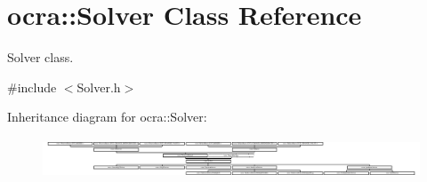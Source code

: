 \hypertarget{classocra_1_1Solver}{}\section{ocra\+:\+:Solver Class Reference}
\label{classocra_1_1Solver}


Solver class.  




{\ttfamily \#include $<$Solver.\+h$>$}

Inheritance diagram for ocra\+:\+:Solver\+:\begin{figure}[H]
\begin{center}
\leavevmode
\includegraphics[height=1.217391cm]{d6/dd3/classocra_1_1Solver}
\end{center}
\end{figure}
